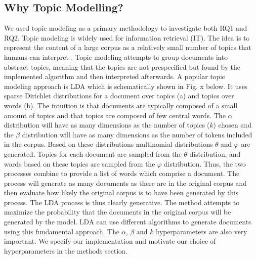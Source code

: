 \documentclass{article}
\begin{document}
    \subsection{Why Topic Modelling?}
    We used topic modeling as a primary methodology to investigate both RQ1 and RQ2. Topic modeling is widely used for information retrieval (IT). The idea is to represent the content of a large corpus as a relatively small number of topics that humans can interpret \cite{arun2010finding}. Topic modeling attempts to group documents into abstract topics, meaning that the topics are not prespecified but found by the implemented algorithm and then interpreted afterwards. 
A popular topic modeling approach is LDA \cite{arun2010finding,cao2009density} which is schematically shown in Fig. x below. It uses sparse Dirichlet distributions for a document over topics (a) and topics over words (b). The intuition is that documents are typically composed of a small amount of topics and that topics are composed of few central words. The $\alpha$ distribution will have as many dimensions as the number of topics ($k$) chosen and the $\beta$ distribution will have as many dimensions as the number of tokens included in the corpus. Based on these distributions multinomial distributions $\theta$ and $\varphi$ are generated. Topics for each document are sampled from the $\theta$ distribution, and words based on these topics are sampled from the $\varphi$ distribution. Thus, the two processes combine to provide a list of words which comprise a document. The process will generate as many documents as there are in the original corpus and then evaluate how likely the original corpus is to have been generated by this process. The LDA process is thus clearly generative. The method attempts to maximize the probability that the documents in the original corpus will be generated by the model. 
LDA can use different algorithms to generate documents using this fundamental approach. The $\alpha$, $\beta$ and $k$ hyperparameters are also very important. We specify our implementation and motivate our choice of hyperparameters in the methods section. 
\end{document}

